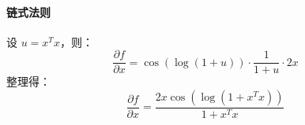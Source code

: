 \paragraph{链式法则}  
设 \(u = x^T x\)，则：
\[
\frac{\partial f}{\partial x} = \cos(\log(1+u)) \cdot \frac{1}{1+u} \cdot 2x
\]
整理得：
\[
\frac{\partial f}{\partial x} = \frac{2x \cos(\log(1+x^T x))}{1 + x^T x}
\]